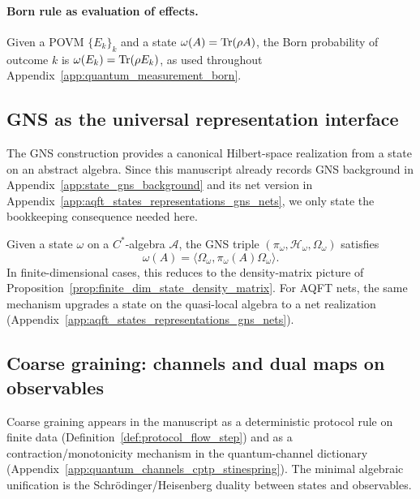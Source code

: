 \paragraph{Born rule as evaluation of effects.}
\InterfaceTag Given a POVM $\{E_k\}_k$ and a state $\omega(A)=\mathrm{Tr}(\rho A)$, the Born probability of outcome $k$ is $\omega(E_k)=\mathrm{Tr}(\rho E_k)$, as used throughout Appendix~\ref{app:quantum_measurement_born}.

\subsection{GNS as the universal representation interface}

The GNS construction provides a canonical Hilbert-space realization from a state on an abstract algebra.
Since this manuscript already records GNS background in Appendix~\ref{app:state_gns_background} and its net version in Appendix~\ref{app:aqft_states_representations_gns_nets}, we only state the bookkeeping consequence needed here.

\begin{remark}\label{rem:gns_bridge_summary}
\MathTag Given a state $\omega$ on a $C^\ast$-algebra $\mathcal{A}$, the GNS triple $(\pi_\omega,\mathcal{H}_\omega,\Omega_\omega)$ satisfies
\[
\omega(A)=\langle \Omega_\omega,\pi_\omega(A)\Omega_\omega\rangle.
\]
In finite-dimensional cases, this reduces to the density-matrix picture of Proposition~\ref{prop:finite_dim_state_density_matrix}.
For AQFT nets, the same mechanism upgrades a state on the quasi-local algebra to a net realization (Appendix~\ref{app:aqft_states_representations_gns_nets}).
\end{remark}

\subsection{Coarse graining: channels and dual maps on observables}

Coarse graining appears in the manuscript as a deterministic protocol rule on finite data (Definition~\ref{def:protocol_flow_step}) and as a contraction/monotonicity mechanism in the quantum-channel dictionary (Appendix~\ref{app:quantum_channels_cptp_stinespring}).
The minimal algebraic unification is the Schr\"odinger/Heisenberg duality between states and observables.


